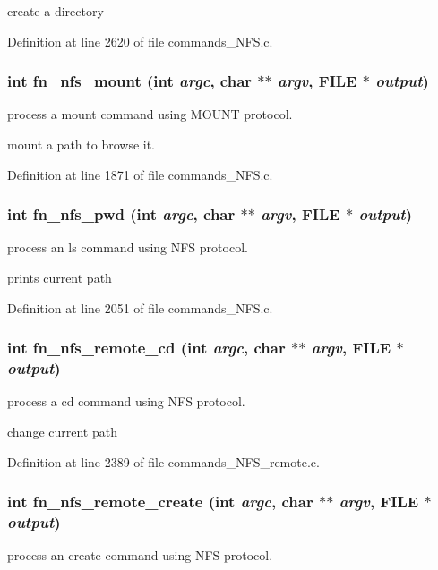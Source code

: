 create a directory 

Definition at line 2620 of file commands\_\-NFS.c.
\subsubsection[{fn\_\-nfs\_\-mount}]{\setlength{\rightskip}{0pt plus 5cm}int fn\_\-nfs\_\-mount (int {\em argc}, \/  char $\ast$$\ast$ {\em argv}, \/  FILE $\ast$ {\em output})}\label{commands_8h_a9f9ce437f72847bc50a8b27738d0792c}
process a mount command using MOUNT protocol.

mount a path to browse it. 

Definition at line 1871 of file commands\_\-NFS.c.
\subsubsection[{fn\_\-nfs\_\-pwd}]{\setlength{\rightskip}{0pt plus 5cm}int fn\_\-nfs\_\-pwd (int {\em argc}, \/  char $\ast$$\ast$ {\em argv}, \/  FILE $\ast$ {\em output})}\label{commands_8h_a4a2c75d01a912e996f8f8e4fdbb02058}
process an ls command using NFS protocol.

prints current path 

Definition at line 2051 of file commands\_\-NFS.c.
\subsubsection[{fn\_\-nfs\_\-remote\_\-cd}]{\setlength{\rightskip}{0pt plus 5cm}int fn\_\-nfs\_\-remote\_\-cd (int {\em argc}, \/  char $\ast$$\ast$ {\em argv}, \/  FILE $\ast$ {\em output})}\label{commands_8h_aa0c49cc5e2f8bb018f0404ad2df7c3cd}
process a cd command using NFS protocol.

change current path 

Definition at line 2389 of file commands\_\-NFS\_\-remote.c.
\subsubsection[{fn\_\-nfs\_\-remote\_\-create}]{\setlength{\rightskip}{0pt plus 5cm}int fn\_\-nfs\_\-remote\_\-create (int {\em argc}, \/  char $\ast$$\ast$ {\em argv}, \/  FILE $\ast$ {\em output})}\label{commands_8h_a3ca2adfaec7b9f76ee58b05ed8eaee96}
process an create command using NFS protocol.

